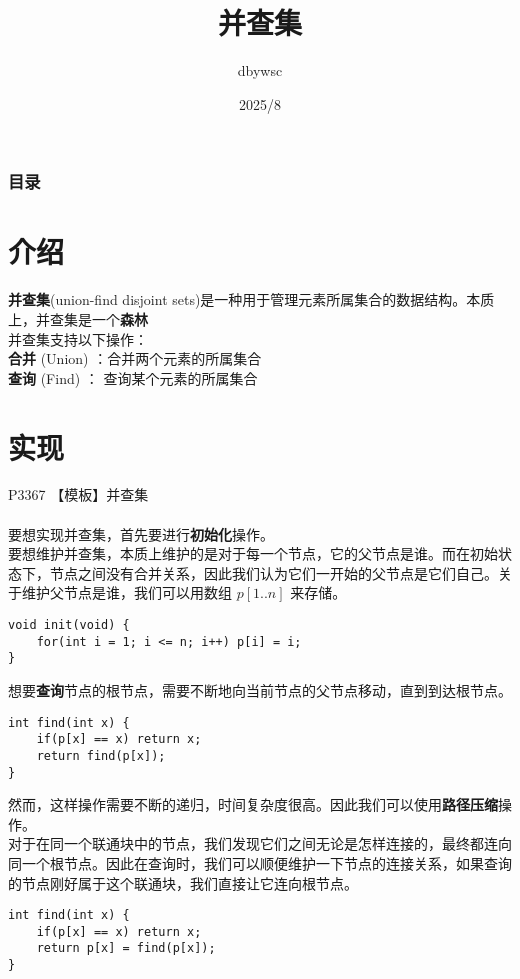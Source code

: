 \documentclass{beamer}
\title{并查集}
\author{dbywsc}
\date{2025/8}
\newcommand{\fdf}[1]{\alert{\textbf{#1}}}
\begin{document}
\frame{\titlepage}
\begin{frame}
	\frametitle{目录}
	\tableofcontents
\end{frame}
\section{介绍}
\begin{frame}
\fdf{并查集}(union-find disjoint sets)是一种用于管理元素所属集合的数据结构。本质上，并查集是一个\fdf{森林}\\
并查集支持以下操作：\\ 
\fdf{合并} (Union) ：合并两个元素的所属集合\\ 
\fdf{查询} (Find) ： 查询某个元素的所属集合\\
\end{frame}
\section{实现}
\begin{frame}[fragile]
P3367 【模板】并查集\\
\\
要想实现并查集，首先要进行\fdf{初始化}操作。\\ 
要想维护并查集，本质上维护的是对于每一个节点，它的父节点是谁。而在初始状态下，节点之间没有合并关系，因此我们认为它们一开始的父节点是它们自己。关于维护父节点是谁，我们可以用数组 $p[1..n]$ 来存储。
\begin{onlyenv}
\begin{verbatim}
void init(void) {
    for(int i = 1; i <= n; i++) p[i] = i;
}
\end{verbatim}
\end{onlyenv}
\end{frame}
\begin{frame}[fragile]
想要\fdf{查询}节点的根节点，需要不断地向当前节点的父节点移动，直到到达根节点。
\begin{onlyenv}
\begin{verbatim}
int find(int x) {
    if(p[x] == x) return x;
    return find(p[x]);
}
\end{verbatim}
\end{onlyenv}
然而，这样操作需要不断的递归，时间复杂度很高。因此我们可以使用\fdf{路径压缩}操作。\\ 
对于在同一个联通块中的节点，我们发现它们之间无论是怎样连接的，最终都连向同一个根节点。因此在查询时，我们可以顺便维护一下节点的连接关系，如果查询的节点刚好属于这个联通块，我们直接让它连向根节点。
\begin{onlyenv}
\begin{verbatim}
int find(int x) {
    if(p[x] == x) return x;
    return p[x] = find(p[x]);
}
\end{verbatim}
\end{onlyenv}
\end{frame}
\end{document}
